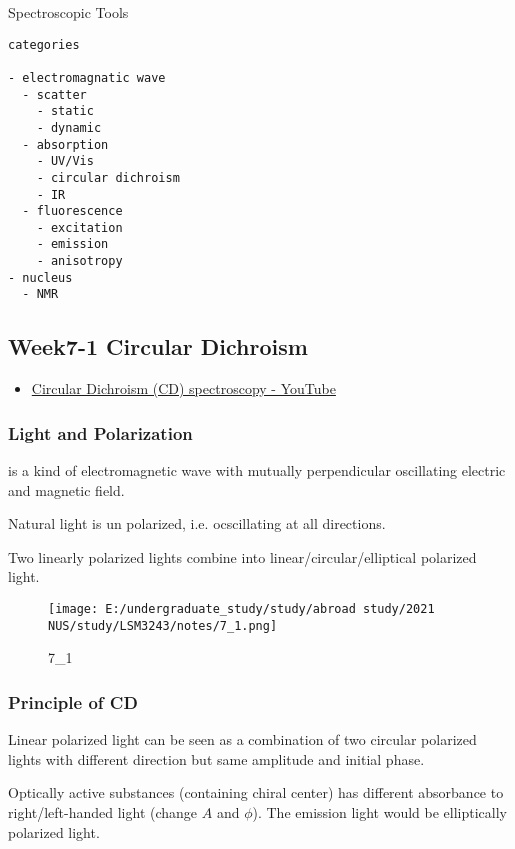 \documentclass[]{article}
\begin{document}
Spectroscopic Tools

\begin{verbatim}
categories

- electromagnatic wave
  - scatter
    - static
    - dynamic
  - absorption
    - UV/Vis
    - circular dichroism
    - IR
  - fluorescence
    - excitation
    - emission
    - anisotropy
- nucleus
  - NMR
\end{verbatim}

\hypertarget{week7-1-circular-dichroism}{%
\subsection{Week7-1 Circular
Dichroism}\label{week7-1-circular-dichroism}}

\begin{itemize}
\item
  \href{https://www.youtube.com/watch?v=F8VGbgi1lwQ}{Circular Dichroism
  (CD) spectroscopy - YouTube}
\end{itemize}

\hypertarget{light-and-polarization}{%
\subsubsection{Light and Polarization}\label{light-and-polarization}}

is a kind of electromagnetic wave with mutually perpendicular
oscillating electric and magnetic field.

Natural light is un polarized, i.e. ocscillating at all directions.

Two linearly polarized lights combine into linear/circular/elliptical
polarized light.

\begin{figure}
\centering
\texttt{[image: E:/undergraduate\_study/study/abroad study/2021 NUS/study/LSM3243/notes/7\_1.png]}
\caption{7\_1}
\end{figure}

\hypertarget{principle-of-cd}{%
\subsubsection{Principle of CD}\label{principle-of-cd}}

Linear polarized light can be seen as a combination of two circular
polarized lights with different direction but same amplitude and initial
phase.

Optically active substances (containing chiral center) has different
absorbance to right/left-handed light (change \(A\) and \(\phi\)). The
emission light would be elliptically polarized light.
\end{document}
